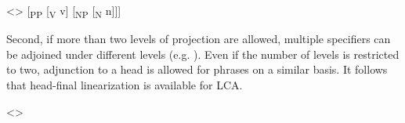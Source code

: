 \documentclass[a4paper, 12pt]{article}
\begin{document}
\begin{sloppypar}
\ex<>
    [\textsubscript{PP} [\textsubscript{V} v] [\textsubscript{NP} [\textsubscript{N} n]]]
\xe

Second, if more than two levels of projection are allowed, multiple specifiers can be adjoined under different levels (e.g. \nextx). Even if the number of levels is restricted to two, adjunction to a head \parencite[17]{kayne1994antisymmetrysyntax} is allowed for phrases on a similar basis. It follows that head-final linearization is available for LCA.



\ex<>\\
\xe




\end{sloppypar}
\end{document}
